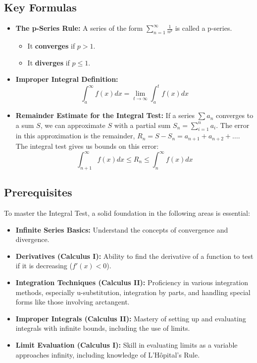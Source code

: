 \documentclass{article}
\begin{document}
\subsection{Key Formulas}
\begin{itemize}
    \item \textbf{The p-Series Rule:} A series of the form $\sum_{n=1}^{\infty} \frac{1}{n^p}$ is called a p-series.
    \begin{itemize}
        \item It \textbf{converges} if $p > 1$.
        \item It \textbf{diverges} if $p \le 1$.
    \end{itemize}
    \item \textbf{Improper Integral Definition:}
    \[ \int_a^\infty f(x) dx = \lim_{t \to \infty} \int_a^t f(x) dx \]
    \item \textbf{Remainder Estimate for the Integral Test:} If a series $\sum a_n$ converges to a sum $S$, we can approximate $S$ with a partial sum $S_n = \sum_{i=1}^{n} a_i$. The error in this approximation is the remainder, $R_n = S - S_n = a_{n+1} + a_{n+2} + \dots$. The integral test gives us bounds on this error:
    \[ \int_{n+1}^\infty f(x) dx \le R_n \le \int_n^\infty f(x) dx \]
\end{itemize}

\subsection{Prerequisites}
To master the Integral Test, a solid foundation in the following areas is essential:
\begin{itemize}
    \item \textbf{Infinite Series Basics:} Understand the concepts of convergence and divergence.
    \item \textbf{Derivatives (Calculus I):} Ability to find the derivative of a function to test if it is decreasing ($f'(x) < 0$).
    \item \textbf{Integration Techniques (Calculus II):} Proficiency in various integration methods, especially u-substitution, integration by parts, and handling special forms like those involving arctangent.
    \item \textbf{Improper Integrals (Calculus II):} Mastery of setting up and evaluating integrals with infinite bounds, including the use of limits.
    \item \textbf{Limit Evaluation (Calculus I):} Skill in evaluating limits as a variable approaches infinity, including knowledge of L'Hôpital's Rule.
\end{itemize}
\end{document}
